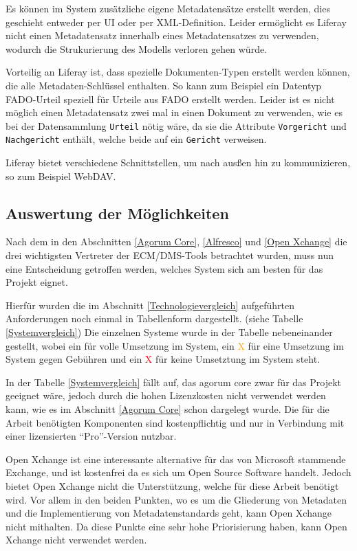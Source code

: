 Es k\"onnen im System zus\"atzliche eigene Metadatens\"atze erstellt werden, dies geschieht entweder per \ac{UI} oder per XML-Definition.
Leider erm\"oglicht es  Liferay nicht einen Metadatensatz innerhalb eines Metadatensatzes zu verwenden, wodurch die Strukurierung des Modells verloren gehen w\"urde.

Vorteilig an Liferay ist, dass spezielle Dokumenten-Typen erstellt werden k\"onnen, die alle Metadaten-Schl\"ussel enthalten. So kann zum Beispiel ein Datentyp \ac{FADO}-Urteil speziell f\"ur Urteile aus \ac{FADO} erstellt werden. Leider ist es nicht m\"oglich einen Metadatensatz zwei mal in einen Dokument zu verwenden, wie es bei der Datensammlung \texttt{Urteil} n\"otig w\"are, da sie die Attribute \texttt{Vorgericht} und \texttt{Nachgericht} enth\"alt, welche beide auf ein \texttt{Gericht} verweisen.

Liferay bietet verschiedene Schnittstellen, um nach aus\ss{}en hin zu kommunizieren, so zum Beispiel WebDAV.


\subsection{Auswertung der M\"oglichkeiten}\label{Auswertung ECM}
Nach dem in den Abschnitten \ref{Agorum Core}, \ref{Alfresco} und \ref{Open Xchange} die drei wichtigsten Vertreter der \ac{ECM}/\ac{DMS}-Tools
betrachtet wurden, muss nun eine Entscheidung getroffen werden, welches System sich am besten f\"ur das Projekt eignet.

Hierf\"ur wurden die im Abschnitt \ref{Technologievergleich} aufgef\"uhrten Anforderungen noch einmal in Tabellenform dargestellt. (siehe Tabelle \ref{Systemvergleich}) Die einzelnen Systeme wurde in der Tabelle nebeneinander gestellt, wobei ein \textcolor{green}{\checkmark} f\"ur volle Umsetzung im System, ein \textcolor{orange}{\checkmark X} f\"ur eine Umsetzung im System gegen Geb\"uhren und ein \textcolor{red}{X} f\"ur keine Umsetztung im System steht.

In der Tabelle \ref{Systemvergleich} f\"allt auf, das agorum core zwar f\"ur das Projekt geeignet w\"are, jedoch durch die hohen Lizenzkosten nicht verwendet werden kann, wie es im Abschnitt \ref{Agorum Core} schon dargelegt wurde. Die f\"ur die Arbeit ben\"otigten Komponenten sind kostenpflichtig und nur in Verbindung mit einer lizensierten "`Pro"'-Version nutzbar.

Open Xchange ist eine interessante alternative f\"ur das von Microsoft stammende Exchange, und ist kostenfrei da es sich um Open Source Software handelt. Jedoch bietet Open Xchange nicht die Unterst\"utzung, welche f\"ur diese Arbeit ben\"otigt wird. Vor allem in den beiden Punkten, wo es um die Gliederung von Metadaten und die Implementierung von Metadatenstandards geht, kann Open Xchange nicht mithalten. Da diese Punkte eine sehr hohe Priorisierung haben, kann Open Xchange nicht verwendet werden.

